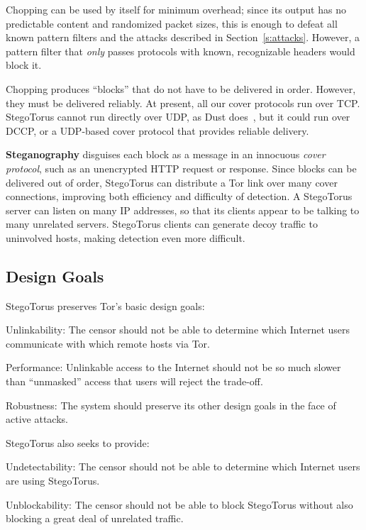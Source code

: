 Chopping can be used by itself for minimum overhead; since its
output has no predictable content and randomized packet sizes, this
is enough to defeat all known pattern filters and the attacks
described in Section~\ref{s:attacks}.  However, a pattern filter
that \emph{only} passes protocols with known, recognizable headers
would block it.

Chopping produces “blocks” that do not have to be delivered in order.
However, they must be delivered reliably.  At present, all our cover
protocols run over TCP.  StegoTorus cannot run directly over UDP, as
Dust does~\cite{c-dust}, but it could run over DCCP, or a UDP-based
cover protocol that provides reliable delivery.

\textbf{Steganography} disguises each block as a message in an innocuous
\emph{cover protocol}, such as an unencrypted HTTP request or
response.  Since blocks can be delivered out of order, StegoTorus
can distribute a Tor link over many cover connections, improving
both efficiency and difficulty of detection.  A StegoTorus server
can listen on many IP addresses, so that its clients appear to be
talking to many unrelated servers.  StegoTorus clients can generate
decoy traffic to uninvolved hosts, making detection even more
difficult.

\subsection{Design Goals}\label{s:threat}

\noindent
StegoTorus preserves Tor's basic design goals:

\smallskip
\begin{compactdesc}
\item[Unlinkability:] The censor should not be able to determine which
  Internet users communicate with which remote hosts via Tor.

\item[Performance:] Unlinkable access to the Internet should not be so
  much slower than “unmasked” access that users will reject the
  trade-off.

\item[Robustness:] The system should preserve its other design goals in
  the face of active attacks.
\end{compactdesc}

\smallskip\noindent
StegoTorus also seeks to provide:

\smallskip
\begin{compactdesc}
\item[Undetectability:] The censor should not be able to determine
  which Internet users are using StegoTorus.

\item[Unblockability:] The censor should not be able to block
  StegoTorus without also blocking a great deal of unrelated
  traffic.
\end{compactdesc}

